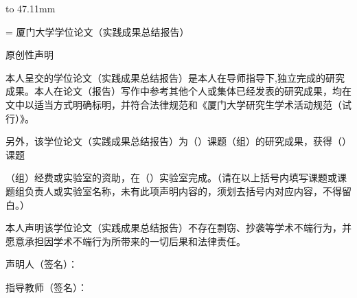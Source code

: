 {{{        %
        \vbox to 47.11mm{%
          \hsize=\textwidth
          \setlength{\parindent}{0pt}%
          \centering
          \mdseries\upshape
          \fontsize{18bp}{31.2bp}\selectfont
          \vskip 12.83mm
          \noindent 厦门大学学位论文（实践成果总结报告）\par
          \noindent 原创性声明\par
          \vss
        }%
        \nointerlineskip
        \indent 本人呈交的学位论文（实践成果总结报告）是本人在导师指导下,独立完成的研究成果。本人在论文（报告）写作中参考其他个人或集体已经发表的研究成果，均在文中以适当方式明确标明，并符合法律规范和《厦门大学研究生学术活动规范（试行）》。\par
        \indent 另外，该学位论文（实践成果总结报告）为（）课题（组）的研究成果，获得（）课题\par
        \noindent （组）经费或实验室的资助，在（）实验室完成。（请在以上括号内填写课题或课题组负责人或实验室名称，未有此项声明内容的，须划去括号内对应内容，不得留白。）\par
        \setlength{\parindent}{10.583mm}%
        \indent 本人声明该学位论文（实践成果总结报告）不存在剽窃、抄袭等学术不端行为，并愿意承担因学术不端行为所带来的一切后果和法律责任。\par

        \noindent\null\par
        \setlength{\parindent}{87.03mm}%
        \indent 声明人\hspace{1em}（签名）：\par
        \indent 指导教师（签名）：\par

}}}

